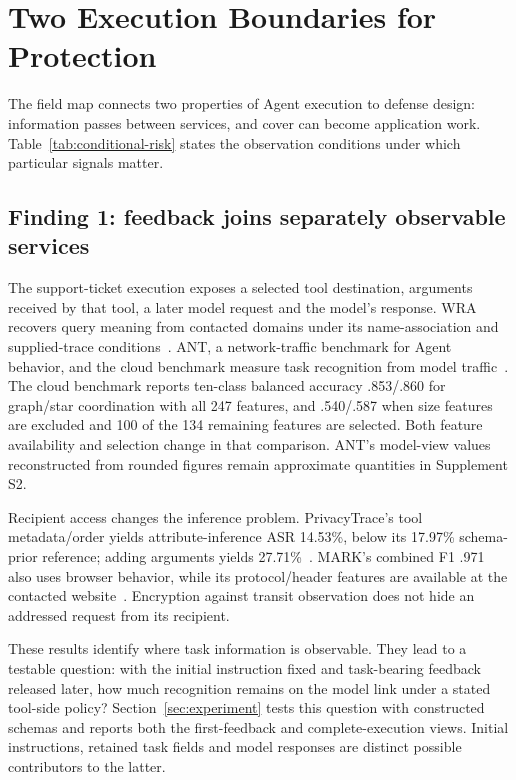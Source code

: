 \section{Two Execution Boundaries for Protection}\label{sec:evidence}
The field map connects two properties of Agent execution to defense design: information passes between services, and cover can become application work. Table~\ref{tab:conditional-risk} states the observation conditions under which particular signals matter.

\subsection{Finding 1: feedback joins separately observable services}\label{sec:authorization}
The support-ticket execution exposes a selected tool destination, arguments received by that tool, a later model request and the model's response. WRA recovers query meaning from contacted domains under its name-association and supplied-trace conditions~\cite{jeong2026wra}. ANT, a network-traffic benchmark for Agent behavior, and the cloud benchmark measure task recognition from model traffic~\cite{li2026ant,pouryousef2026traffic}. The cloud benchmark reports ten-class balanced accuracy .853/.860 for graph/star coordination with all 247 features, and .540/.587 when size features are excluded and 100 of the 134 remaining features are selected. Both feature availability and selection change in that comparison. ANT's model-view values reconstructed from rounded figures remain approximate quantities in Supplement S2.



Recipient access changes the inference problem. PrivacyTrace's tool metadata/order yields attribute-inference ASR 14.53\%, below its 17.97\% schema-prior reference; adding arguments yields 27.71\%~\cite{duan2026privacytrace}. MARK's combined F1 .971 also uses browser behavior, while its protocol/header features are available at the contacted website~\cite{kang2026whoseagent}. Encryption against transit observation does not hide an addressed request from its recipient.

These results identify where task information is observable. They lead to a testable question: with the initial instruction fixed and task-bearing feedback released later, how much recognition remains on the model link under a stated tool-side policy? Section~\ref{sec:experiment} tests this question with constructed schemas and reports both the first-feedback and complete-execution views. Initial instructions, retained task fields and model responses are distinct possible contributors to the latter.

